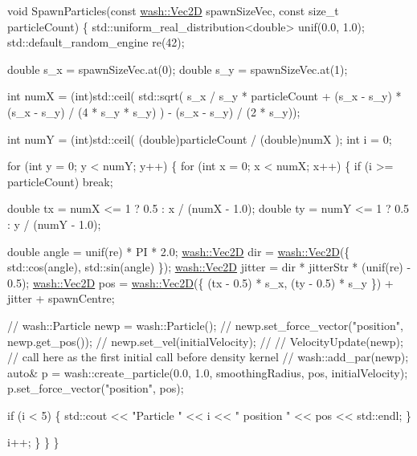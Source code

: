 \begin{DoxyCode}
\textcolor{keywordtype}{void} SpawnParticles(\textcolor{keyword}{const} \mbox{\hyperlink{classwash_1_1Vec}{wash::Vec2D}} spawnSizeVec, \textcolor{keyword}{const} \textcolor{keywordtype}{size\_t} particleCount) \{
    std::uniform\_real\_distribution<double> unif(0.0, 1.0);
    std::default\_random\_engine re(42);

    \textcolor{keywordtype}{double} s\_x = spawnSizeVec.at(0);
    \textcolor{keywordtype}{double} s\_y = spawnSizeVec.at(1);

    \textcolor{keywordtype}{int} numX = (int)std::ceil( std::sqrt(
        s\_x / s\_y * particleCount + (s\_x - s\_y) * (s\_x - s\_y) / (4 * s\_y * s\_y)
    ) - (s\_x - s\_y) / (2 * s\_y));

    \textcolor{keywordtype}{int} numY = (int)std::ceil( (\textcolor{keywordtype}{double})particleCount / (double)numX );
    \textcolor{keywordtype}{int} i = 0;

    \textcolor{keywordflow}{for} (\textcolor{keywordtype}{int} y = 0; y < numY; y++) \{
        \textcolor{keywordflow}{for} (\textcolor{keywordtype}{int} x = 0; x < numX; x++) \{
            \textcolor{keywordflow}{if} (i >= particleCount) \textcolor{keywordflow}{break};

            \textcolor{keywordtype}{double} tx = numX <= 1 ? 0.5 : x / (numX - 1.0);
            \textcolor{keywordtype}{double} ty = numY <= 1 ? 0.5 : y / (numY - 1.0);

            \textcolor{keywordtype}{double} angle = unif(re) * PI * 2.0;
            \mbox{\hyperlink{classwash_1_1Vec}{wash::Vec2D}} dir = \mbox{\hyperlink{classwash_1_1Vec}{wash::Vec2D}}(\{ std::cos(angle), std::sin(angle) \});
            \mbox{\hyperlink{classwash_1_1Vec}{wash::Vec2D}} jitter = dir * jitterStr * (unif(re) - 0.5);
            \mbox{\hyperlink{classwash_1_1Vec}{wash::Vec2D}} pos = \mbox{\hyperlink{classwash_1_1Vec}{wash::Vec2D}}(\{ (tx - 0.5) * s\_x, (ty - 0.5) * s\_y \}) + 
      jitter + spawnCentre;

            \textcolor{comment}{// wash::Particle newp = wash::Particle();}
            \textcolor{comment}{// newp.set\_force\_vector("position", newp.get\_pos());}
            \textcolor{comment}{// newp.set\_vel(initialVelocity);}
            \textcolor{comment}{// // VelocityUpdate(newp); // call here as the first initial call before density kernel}
            \textcolor{comment}{// wash::add\_par(newp);}
            \textcolor{keyword}{auto}& p = wash::create\_particle(0.0, 1.0, smoothingRadius, pos, initialVelocity);
            p.set\_force\_vector(\textcolor{stringliteral}{"position"}, pos);

            \textcolor{keywordflow}{if} (i < 5) \{
                std::cout << \textcolor{stringliteral}{"Particle "} << i << \textcolor{stringliteral}{" position "} << pos << std::endl;
            \}

            i++;
        \}
    \}
\}
\end{DoxyCode}



